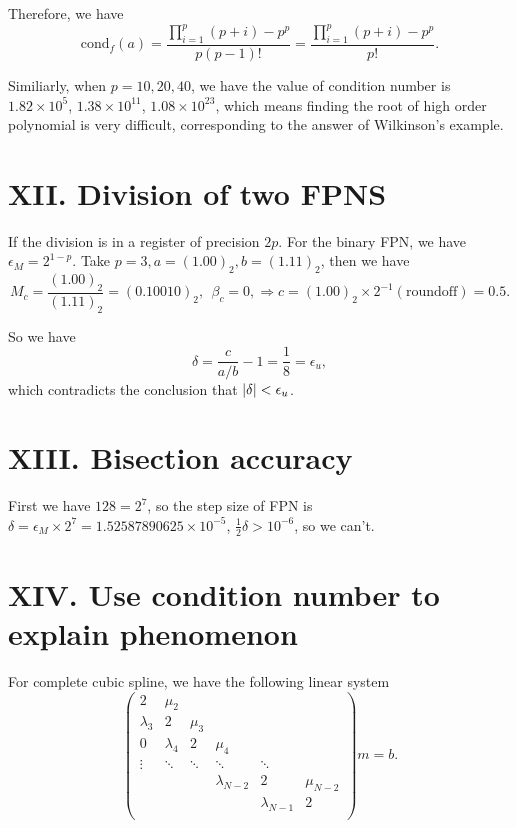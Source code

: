 \documentclass[a4paper]{article}
\begin{document}
Therefore, we have
\begin{equation}
    \mathrm{cond}_f(a) = \frac{\prod_{i=1}^{p}(p+i) - p^p}{p (p-1)!} = \frac{\prod_{i=1}^{p}(p+i) - p^p}{p!}.
\end{equation}

Similiarly, when $p=10, 20, 40$, we have the value of condition number is $1.82 \times 10^5$, $1.38 \times 10^{11}$, $1.08 \times 10^{23}$, which means finding the root of high order polynomial is very difficult, corresponding to the answer of Wilkinson's example.


\section*{XII. Division of two FPNS}

If the division is in a register of precision $2p$. For the binary FPN, we have $\epsilon_M = 2^{1-p}$. Take $p=3, a=(1.00)_2, b=(1.11)_2$, then we have
\begin{equation}
    M_c = \frac{(1.00)_2}{(1.11)_2} = (0.10010)_2, ~~ \beta_c = 0, \Rightarrow c = (1.00)_2 \times 2^{-1} (\text{roundoff}) = 0.5.
\end{equation}

So we have 
\begin{equation}
    \delta = \frac{c}{a/b} - 1 = \frac{1}{8} = \epsilon_u, 
\end{equation}
which contradicts the conclusion that $\abs{\delta} < \epsilon_u$.

\section*{XIII. Bisection accuracy}

First we have $128 = 2^7$, so the step size of FPN is $\delta = \epsilon_M \times 2^7 = 1.52587890625 \times 10^{-5}$, $\frac{1}{2} \delta > 10^{-6}$, so we can't. 

\section*{XIV. Use condition number to explain phenomenon}

For complete cubic spline, we have the following linear system
\begin{equation}
    \begin{pmatrix}
        2 & \mu_2 & & & & \\
        \lambda_3 & 2 & \mu_3 & & & \\
        0 & \lambda_4 & 2 & \mu_4 & &\\
        \vdots & \ddots & \ddots & \ddots & \ddots & \\
        & & & \lambda_{N-2} & 2 & \mu_{N-2} \\
        & & & & \lambda_{N-1} & 2 \\
    \end{pmatrix}
    m = b. 
\end{equation}
\end{document}

